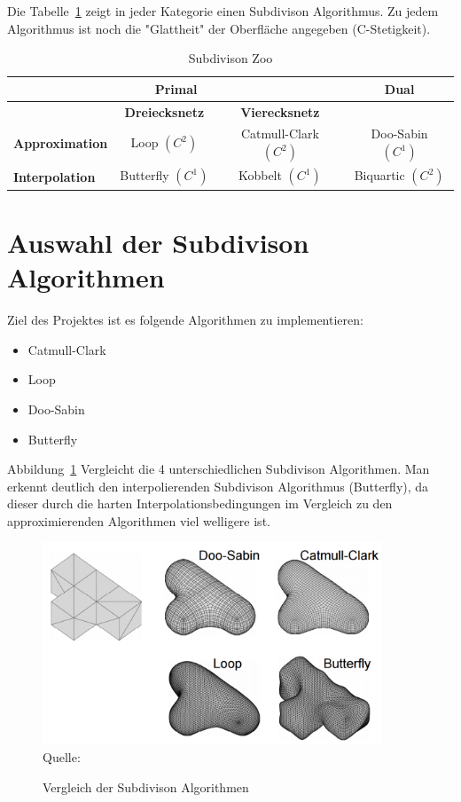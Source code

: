 Die Tabelle~\ref{tab:sd_comp} zeigt in jeder Kategorie einen Subdivison Algorithmus.
Zu jedem Algorithmus ist noch die "Glattheit" der Oberfläche angegeben (C-Stetigkeit).
\begin{table}[h]
\caption{Subdivison Zoo}
\center
\begin{tabular}{l|c|c|c}
\toprule
\multicolumn{3}{c|}{\textbf{Primal}} & \textbf{Dual}\\
\midrule
& \textbf{Dreiecksnetz} & \textbf{Vierecksnetz} & \\
\midrule
\textbf{Approximation} & Loop \((C^2)\) & Catmull-Clark \((C^2)\) & Doo-Sabin \((C^1)\) \\
\textbf{Interpolation} & Butterfly \((C^1)\) & Kobbelt \((C^1)\) & Biquartic \((C^2)\) \\
\bottomrule
\end{tabular}
\label{tab:sd_comp}
\end{table}


\section{Auswahl der Subdivison Algorithmen}

Ziel des Projektes ist es folgende Algorithmen zu implementieren:
\begin{itemize}
	\item Catmull-Clark
	\item Loop
	\item Doo-Sabin
	\item Butterfly
\end{itemize}

Abbildung~\ref{fig:sd_comp} Vergleicht die 4 unterschiedlichen Subdivison Algorithmen.
Man erkennt deutlich den interpolierenden Subdivison Algorithmus (Butterfly),
da dieser durch die harten Interpolationsbedingungen im Vergleich zu den approximierenden Algorithmen viel welligere ist.
\begin{figure}[h]
  \caption{Vergleich der Subdivison Algorithmen}
  \centering
  \includegraphics[width=0.9\textwidth]{content/media/sd_overview.png}
  \\Quelle: \cite{Standford.}
  \label{fig:sd_comp}
\end{figure}
